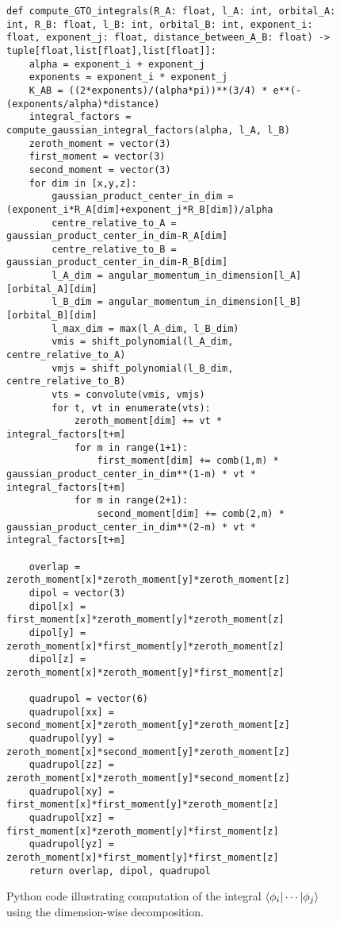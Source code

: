 \begin{figure}[H]
\begin{verbatim}
def compute_GTO_integrals(R_A: float, l_A: int, orbital_A: int, R_B: float, l_B: int, orbital_B: int, exponent_i: float, exponent_j: float, distance_between_A_B: float) -> tuple[float,list[float],list[float]]:
    alpha = exponent_i + exponent_j
    exponents = exponent_i * exponent_j
    K_AB = ((2*exponents)/(alpha*pi))**(3/4) * e**(-(exponents/alpha)*distance)
    integral_factors = compute_gaussian_integral_factors(alpha, l_A, l_B)
    zeroth_moment = vector(3)
    first_moment = vector(3)
    second_moment = vector(3)
    for dim in [x,y,z]:
        gaussian_product_center_in_dim = (exponent_i*R_A[dim]+exponent_j*R_B[dim])/alpha
        centre_relative_to_A = gaussian_product_center_in_dim-R_A[dim]
        centre_relative_to_B = gaussian_product_center_in_dim-R_B[dim]
        l_A_dim = angular_momentum_in_dimension[l_A][orbital_A][dim]
        l_B_dim = angular_momentum_in_dimension[l_B][orbital_B][dim]
        l_max_dim = max(l_A_dim, l_B_dim)
        vmis = shift_polynomial(l_A_dim, centre_relative_to_A)
        vmjs = shift_polynomial(l_B_dim, centre_relative_to_B)
        vts = convolute(vmis, vmjs)
        for t, vt in enumerate(vts):
            zeroth_moment[dim] += vt * integral_factors[t+m]
            for m in range(1+1):
                first_moment[dim] += comb(1,m) * gaussian_product_center_in_dim**(1-m) * vt * integral_factors[t+m]
            for m in range(2+1):
                second_moment[dim] += comb(2,m) * gaussian_product_center_in_dim**(2-m) * vt * integral_factors[t+m]

    overlap = zeroth_moment[x]*zeroth_moment[y]*zeroth_moment[z]
    dipol = vector(3)
    dipol[x] = first_moment[x]*zeroth_moment[y]*zeroth_moment[z]
    dipol[y] = zeroth_moment[x]*first_moment[y]*zeroth_moment[z]
    dipol[z] = zeroth_moment[x]*zeroth_moment[y]*first_moment[z]

    quadrupol = vector(6)
    quadrupol[xx] = second_moment[x]*zeroth_moment[y]*zeroth_moment[z]
    quadrupol[yy] = zeroth_moment[x]*second_moment[y]*zeroth_moment[z]
    quadrupol[zz] = zeroth_moment[x]*zeroth_moment[y]*second_moment[z]
    quadrupol[xy] = first_moment[x]*first_moment[y]*zeroth_moment[z]
    quadrupol[xz] = first_moment[x]*zeroth_moment[y]*first_moment[z]
    quadrupol[yz] = zeroth_moment[x]*first_moment[y]*first_moment[z]
    return overlap, dipol, quadrupol
\end{verbatim}
    \caption{Python code illustrating computation of the integral $\braket{\phi_i|\cdots|\phi_j}$ using the dimension-wise decomposition.}
\end{figure}

